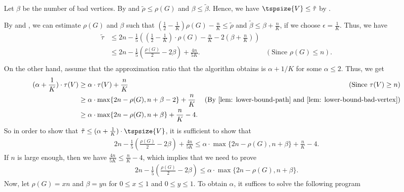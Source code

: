 \begin{myproof}
Let $\beta$ be the number of bad vertices. By  and  $\tilde{\rho} \leq \rho(G)$ and $\beta \leq \tilde{\beta}$. Hence, we have $\tspsize{V} \leq \tilde{\tau}$ by .

By  and , we can estimate $\rho(G)$ and $\beta$ such that $\left(\frac{1}{2} - \frac{1}{K} \right)\rho(G) - \frac{n}{K} \leq \tilde{\rho}$ and $\tilde{\beta} \leq \beta + \frac{n}{K}$, if we choose $\epsilon = \frac{1}{K}$. Thus, we have
\begin{align*}
    \tilde{\tau} & \leq 2n - \frac{1}{5}\left( (\frac{1}{2} - \frac{1}{K})\cdot \rho(G) - \frac{n}{K} - 2(\beta + \frac{n}{K}) \right) \\
    & \leq 2n - \frac{1}{5}(\frac{\rho(G)}{2} - 2\beta) + \frac{4n}{5K}.& (\text{Since } \rho(G) \leq n). \\
\end{align*}
On the other hand, assume that the approximation ratio that the algorithm obtains is $\alpha + 1/K$ for some $\alpha \leq 2$. Thus, we get 
\begin{align*}
    (\alpha+ \frac{1}{K})\cdot \tau(V) & \geq \alpha\cdot\tau(V) + \frac{n}{K} & (\text{Since } \tau(V) \geq n) \\ 
    & \geq \alpha\cdot \max\{2n - \rho(G), n + \beta - 2\} + \frac{n}{K} & (\text{By  \Cref{lem: lower-bound-path}  and  \Cref{lem: lower-bound-bad-vertex}})\\
    & \geq \alpha\cdot \max\{2n - \rho(G), n + \beta\} + \frac{n}{K} - 4.
\end{align*}
So in order to show that $\tilde{\tau} \leq (\alpha + \frac{1}{K}) \cdot\tspsize{V}$, it is sufficient to show that 
\begin{align*}
2n - \frac{1}{5}(\frac{\rho(G)}{2} - 2\beta) + \frac{4n}{5K} \leq \alpha\cdot \max\{2n - \rho(G), n + \beta\} + \frac{n}{K} - 4.
\end{align*}
If $n$ is large enough, then we have $\frac{4n}{5K} \leq \frac{n}{K} - 4$, which implies that we need to prove
\begin{align*}
    2n - \frac{1}{5}(\frac{\rho(G)}{2} - 2\beta) \leq \alpha\cdot \max\{2n - \rho(G), n + \beta\}.
\end{align*}
Now, let $\rho(G) = xn$ and $\beta = yn$ for $0 \leq x \leq 1$ and $ 0\leq y \leq 1$. To obtain $\alpha$, it suffices to solve the following program
\begin{align*}

\end{align*}
\end{myproof}
